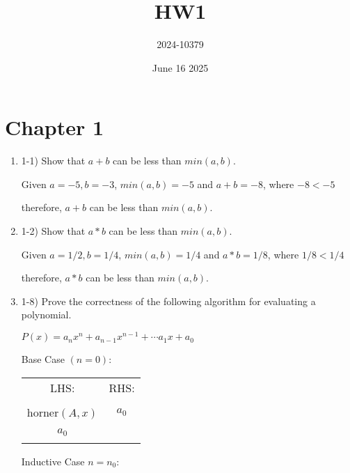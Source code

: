 \documentclass{article}
\title{HW1}
\author{2024-10379}
\date{June 16 2025}
\begin{document}
\maketitle

\section{Chapter 1}
\begin{enumerate}
    \item 1-1) Show that $a + b$ can be less than $min(a,b)$.
    
    Given $a = -5, b = -3$, $min(a,b) = -5$ and $a+b = -8$, where $-8 < -5$
    
    therefore, $a+b$ can be less than $min(a,b)$.
    
    \item 1-2) Show that $ a * b $ can be less than $min(a,b)$.
    
    Given $a = 1/2, b = 1/4$, $min(a,b) = 1/4$ and $a*b = 1/8$, where $1/8 < 1/4$
    
    therefore, $a*b$ can be less than $min(a,b)$.
    
    \item 1-8) Prove the correctness of the following algorithm for evaluating a polynomial.

    $P(x) = a_nx^n + a_{n-1}x^{n-1} + \cdots  a_1x + a_0$
    

    Base Case $(n = 0)$:
    \begin{center}
        \begin{tabular}{ c | c } 
        LHS: & RHS: \\ & \\
        horner$(A, x)$ & $ a_0$ \\ \\
        $ a_0 $ & \\ \\
        \end{tabular}
    \end{center}
    Inductive Case $ n = n_0 $:
    

\end{enumerate}
\end{document}
